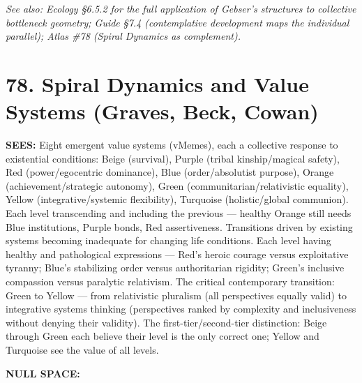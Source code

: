 \textit{See also: Ecology §6.5.2 for the full application of Gebser's structures to collective bottleneck geometry; Guide §7.4 (contemplative development maps the individual parallel); Atlas \#78 (Spiral Dynamics as complement).}


\bigskip\noindent\makebox[\textwidth]{\color{rulegray}\rule{5cm}{0.3pt}}\bigskip


\section*{78. Spiral Dynamics and Value Systems (Graves, Beck, Cowan)}


\textbf{SEES:} Eight emergent value systems (vMemes), each a collective response to existential conditions: Beige (survival), Purple (tribal kinship/magical safety), Red (power/egocentric dominance), Blue (order/absolutist purpose), Orange (achievement/strategic autonomy), Green (communitarian/relativistic equality), Yellow (integrative/systemic flexibility), Turquoise (holistic/global communion). Each level transcending and including the previous — healthy Orange still needs Blue institutions, Purple bonds, Red assertiveness. Transitions driven by existing systems becoming inadequate for changing life conditions. Each level having healthy and pathological expressions — Red's heroic courage versus exploitative tyranny; Blue's stabilizing order versus authoritarian rigidity; Green's inclusive compassion versus paralytic relativism. The critical contemporary transition: Green to Yellow — from relativistic pluralism (all perspectives equally valid) to integrative systems thinking (perspectives ranked by complexity and inclusiveness without denying their validity). The first-tier/second-tier distinction: Beige through Green each believe their level is the only correct one; Yellow and Turquoise see the value of all levels.


\textbf{NULL SPACE:}

